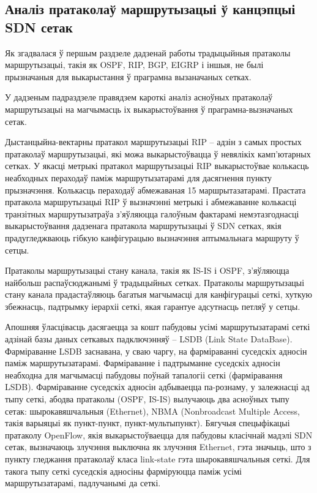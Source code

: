 \subsection{Аналіз пратаколаў маршрутызацыі ў канцэпцыі SDN сетак}

Як згадвалася ў першым раздзеле дадзенай работы традыцыйныя пратаколы
маршрутызацыі, такія як OSPF, RIP, BGP, EIGRP і іншыя, не былі прызначаныя
для выкарыстання ў праграмна вызаначаных сетках.

У дадзеным падраздзеле правядзем кароткі аналіз асноўных пратаколаў маршрутызацыі на магчымасць іх выкарыстоўвання  ў
праграмна-вызначаных сетак.

Дыстанцыйна-вектарны пратакол маршрутызацыі RIP -- адзін з самых простых пратаколаў маршрутызацыі, які можа выкарыстоўвацца ў невялікіх камп'ютарных сетках.
У якасці метрыкі пратакол маршрутызацыі RIP выкарыстоўвае колькасць неабходных пераходаў паміж маршрутызатарамі для дасягнення пункту
прызначэння. Колькасць пераходаў абмежаваная 15 маршрытазатарамі.
Прастата пратакола маршрутызацыі RIP ў вызначэнні метрыкі і абмежаванне
колькасці транзітных маршрутызатраўа
з'яўляюцца галоўным фактарамі немэтазгоднасці выкарыстоўвання дадзенага
пратакола маршрутызацыі ў SDN сетках, якія прадугледжваюць гібкую канфігурацыю вызначэння аптымальнага маршруту ў сетцы.

Пратаколы маршрутызацыі стану канала, такія як IS-IS і OSPF, з'яўляюцца
найбольш распаўсюджанымі ў традыцыйных сетках. Пратаколы маршрутызацыі
стану канала прадастаўляюць багатыя магчымасці для канфігурацыі сеткі,
хуткую збежнасць, падтрымку іерархіі сеткі, якая гарантуе адсутнасць
петляў у сетцы.

Апошняя ўласцівасць дасягаецца за кошт пабудовы усімі маршрутызатарамі сеткі адзінай базы даных сеткавых падключэнняў -- LSDB (Link State DataBase). Фарміраванне LSDB заснавана, у сваю чаргу, на фарміраванні суседскіх адносін паміж маршрутызатарамі. Фарміраванне і падтрыманне суседскіх адносін неабходна для магчымасці пабудовы поўнай тапалогіі сеткі (фарміравання LSDB). Фарміраванне суседскіх адносін адбываецца па-рознаму, у залежнасці ад тыпу сеткі, абодва пратаколы (OSPF, IS-IS) вылучаюць два асноўных тыпу сетак: шырокавяшчальныя (Ethernet), NBMA (Nonbroadcast
Multiple Access, такія варыяцыі як пункт-пункт, пункт-мультыпункт).
Бягучыя спецыфікацыі пратаколу OpenFlow, якія выкарыстоўваецца для пабудовы класічнай мадэлі SDN сетак, вызначаюць злучэння выключна як злучэння Ethernet, гэта значыць, што  з пункту гледжання пратаколаў класа link-state гэта шырокавяшчальныя сеткі. Для такога тыпу сеткі суседскія адносіны фарміруюцца паміж усімі маршрутызатарамі, падлучанымі да сеткі.

